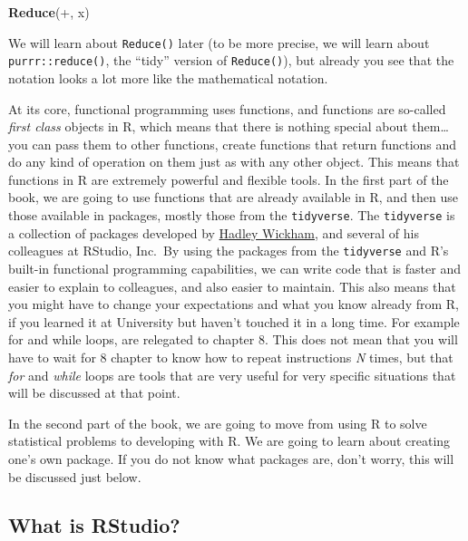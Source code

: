 \documentclass[
]{article}
\newenvironment{Shaded}{\begin{snugshade}}{\end{snugshade}}
\newcommand{\DataTypeTok}[1]{\textcolor[rgb]{0.13,0.29,0.53}{#1}}
\newcommand{\KeywordTok}[1]{\textcolor[rgb]{0.13,0.29,0.53}{\textbf{#1}}}
\newcommand{\NormalTok}[1]{#1}
\newcommand{\StringTok}[1]{\textcolor[rgb]{0.31,0.60,0.02}{#1}}
\begin{document}
\begin{Shaded}
\begin{Highlighting}[]
\KeywordTok{Reduce}\NormalTok{(}\StringTok{\textasciigrave{}}\DataTypeTok{+}\StringTok{\textasciigrave{}}\NormalTok{, x)}
\end{Highlighting}
\end{Shaded}

We will learn about \texttt{Reduce()} later (to be more precise, we will learn about \texttt{purrr::reduce()},
the ``tidy'' version of \texttt{Reduce()}), but already you see that the notation looks a lot more
like the mathematical notation.

At its core, functional programming uses functions, and functions are so-called \emph{first
class} objects in R, which means that there is nothing special about them\ldots{} you can pass them to
other functions, create functions that return functions and do any kind of operation on them just as
with any other object. This means that functions in R are extremely powerful and flexible tools.
In the first part of the book, we are going to use functions that are already available in R, and
then use those available in packages, mostly those from the \texttt{tidyverse}. The \texttt{tidyverse} is a
collection of packages developed by \href{http://hadley.nz/}{Hadley Wickham}, and several of his colleagues
at RStudio, Inc.~By using the packages from the \texttt{tidyverse} and R's built-in functional programming
capabilities, we can write code that is faster and easier to explain to colleagues, and also easier
to maintain. This also means that you might have to change your expectations and what you know
already from R, if you learned it at University but haven't touched it in a long time. For example
for and while loops, are relegated to chapter 8. This does not mean that you will have to wait for
8 chapter to know how to repeat instructions \emph{N} times, but that \emph{for} and \emph{while} loops are tools that
are very useful for very specific situations that will be discussed at that point.

In the second part of the book, we are going to move from using R to solve statistical problems to
developing with R. We are going to learn about creating one's own package. If you do not know what
packages are, don't worry, this will be discussed just below.

\hypertarget{what-is-rstudio}{%
\subsection*{What is RStudio?}\label{what-is-rstudio}}
\end{document}
